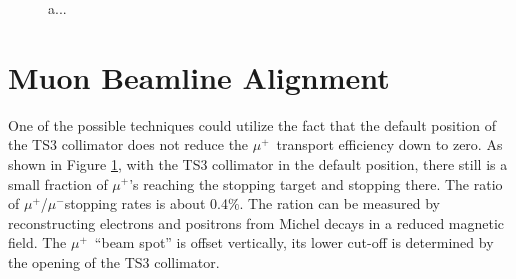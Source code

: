 \documentclass[12pt]{article}
\newcommand {\muminus}    {\mbox{$\mu^-$}}
\newcommand {\muplus}    {\mbox{$\mu^+$}}
\begin{document}
\begin{figure}[H]
  \hspace{-0.5in}
  \caption{
    \label{fig:03101_bmum0s31b0_vdet_x309_mom}
    a... 
  }
\end{figure}

\section {Muon Beamline Alignment}

One of the possible techniques could utilize the fact that the default position of the TS3 collimator does not reduce the \muplus \
transport efficiency down to zero.
%
As shown in Figure \ref{fig:03101_bmum0s31b0_vdet_x309_mom}, with the TS3 collimator 
in the default position, there still is a small fraction of $\mu^+$'s reaching
the stopping target and stopping there. The ratio of \muplus/\muminus stopping rates
is about 0.4\%.  
The ration can be measured by reconstructing electrons and positrons
from Michel decays in a reduced magnetic field.
%
The \muplus\ ``beam spot'' is offset vertically, its lower cut-off is determined by the opening
of the TS3 collimator.
\end{document}
